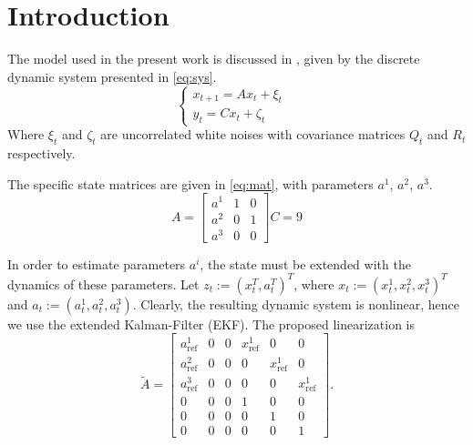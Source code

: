 \section{Introduction}\label{sec:intro}
The model used in the present work is discussed in \cite{wei2017parameter}, given by the discrete dynamic system presented in \cref{eq:sys}.
\begin{equation}\label{eq:sys}
  \begin{cases}
    x_{t+1}=A x_t+\xi_t&\\
    y_{t}=Cx_t + \zeta_t&
  \end{cases}
\end{equation}
Where $\xi_t$ and $\zeta_t$ are uncorrelated white noises with covariance matrices $Q_t$ and $R_t$ respectively.

The specific state matrices are given in \cref{eq:mat}, with parameters $a^1$, $a^2$, $a^3$.
\begin{equation}\label{eq:mat}
A=\begin{bmatrix}
{a^{1}} & {1} & {0} \\
{a^{2}} & {0} & {1} \\
{a^{3}} & {0} & {0}
\end{bmatrix}
C=9
\end{equation}

In order to estimate parameters $a^i$, the state must be extended with the dynamics of these parameters. Let $z_t:=(x_t^T, a_t^T)^T$, where $x_t:=(x_t^1,x_t^2,x_t^3)^T$ and $a_t:=(a_t^1,a_t^2,a_t^3)$. Clearly, the resulting dynamic system is nonlinear, hence we use the extended Kalman-Filter (EKF). The proposed linearization is
\begin{equation}\label{eq:linmat}
  \tilde{A}=\begin{bmatrix}
    a^1_{\text{ref}} & 0 & 0 & x^1_{\text{ref}} & 0 & 0\\
    a^2_{\text{ref}} & 0 & 0 & 0 & x^1_{\text{ref}} & 0\\
    a^3_{\text{ref}} & 0 & 0 & 0 & 0 & x^1_{\text{ref}}\\
    0 & 0 & 0 & 1 & 0 & 0\\
    0 & 0 & 0 & 0 & 1 & 0\\
    0 & 0 & 0 & 0 & 0 & 1
  \end{bmatrix}.
\end{equation}

